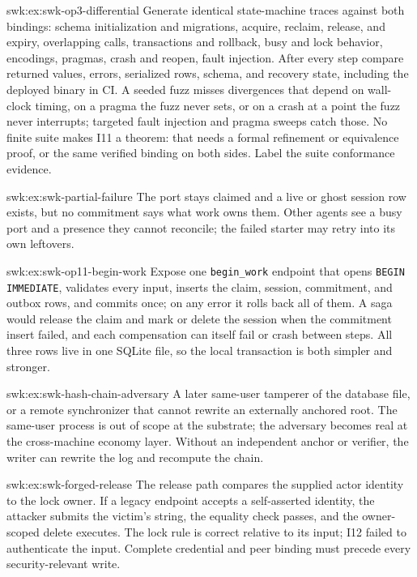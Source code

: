 \begin{pdSolution}{swk:ex:swk-op3-differential}
Generate identical state-machine traces against both bindings: schema initialization and migrations, acquire, reclaim, release, and expiry, overlapping calls, transactions and rollback, busy and lock behavior, encodings, pragmas, crash and reopen, fault injection. After every step compare returned values, errors, serialized rows, schema, and recovery state, including the deployed binary in CI. A seeded fuzz misses divergences that depend on wall-clock timing, on a pragma the fuzz never sets, or on a crash at a point the fuzz never interrupts; targeted fault injection and pragma sweeps catch those. No finite suite makes I11 a theorem: that needs a formal refinement or equivalence proof, or the same verified binding on both sides. Label the suite conformance evidence.
\end{pdSolution}
\begin{pdSolution}{swk:ex:swk-partial-failure}
The port stays claimed and a live or ghost session row exists, but no commitment says what work owns them. Other agents see a busy port and a presence they cannot reconcile; the failed starter may retry into its own leftovers.
\end{pdSolution}
\begin{pdSolution}{swk:ex:swk-op11-begin-work}
Expose one \texttt{begin\_work} endpoint that opens \texttt{BEGIN IMMEDIATE}, validates every input, inserts the claim, session, commitment, and outbox rows, and commits once; on any error it rolls back all of them. A saga would release the claim and mark or delete the session when the commitment insert failed, and each compensation can itself fail or crash between steps. All three rows live in one SQLite file, so the local transaction is both simpler and stronger.
\end{pdSolution}
\begin{pdSolution}{swk:ex:swk-hash-chain-adversary}
A later same-user tamperer of the database file, or a remote synchronizer that cannot rewrite an externally anchored root. The same-user process is out of scope at the substrate; the adversary becomes real at the cross-machine economy layer. Without an independent anchor or verifier, the writer can rewrite the log and recompute the chain.
\end{pdSolution}
\begin{pdSolution}{swk:ex:swk-forged-release}
The release path compares the supplied actor identity to the lock owner. If a legacy endpoint accepts a self-asserted identity, the attacker submits the victim's string, the equality check passes, and the owner-scoped delete executes. The lock rule is correct relative to its input; I12 failed to authenticate the input. Complete credential and peer binding must precede every security-relevant write.
\end{pdSolution}

